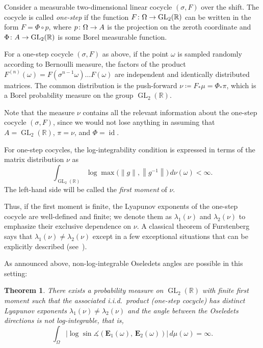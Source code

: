 \documentclass[10pt]{amsart}
\newtheorem{theo}{Theorem}[section]
\theoremstyle{definition}\newtheorem{defi}[theo]{Definition}\newtheorem{rema}[theo]{Remark}\newtheorem{exam}[theo]{Example}\newtheorem{exem}[theo]{Example}\newtheorem{nota}[theo]{Notation}
\newcommand{\R}{\mathbb{R}}
\newcommand{\E}{\mathbf{E}}
\DeclareMathOperator{\GL}{GL}
\DeclareMathOperator{\idd}{id}
\renewcommand{\angle}{\measuredangle}
\renewcommand*{\to}{\mathchoice{\longrightarrow}{\rightarrow}{\rightarrow}{\rightarrow}}
\begin{document}
Consider a measurable two-dimensional linear cocycle $(\sigma, F)$ over the shift. The cocycle is called \emph{one-step} if the function $F \colon \Omega \to \GL_2(\R)$ can be written in the form $F = \Phi \circ p$, where $p \colon \Omega \to A$ is the projection on the zeroth coordinate and $\Phi \colon A \to \GL_2(\R)$ is some Borel measurable function.

For a one-step cocycle $(\sigma, F)$ as above, if the point $\omega$ is sampled randomly according to Bernoulli measure, the factors of the product $F^{(n)}(\omega) = F(\sigma^{n-1} \omega) \dots F(\omega)$ are independent and identically distributed matrices. The common distribution is the push-forward $\nu \coloneqq F_* \mu = \Phi_* \pi$, which is a Borel probability measure on the group $\GL_2(\R)$.

Note that the measure $\nu$ contains all the relevant information about the one-step cocycle $(\sigma,F)$, since we would not lose anything in assuming that $A = \GL_2(\R)$, $\pi = \nu$, and $\Phi = \idd$.

For one-step cocycles, the log-integrability condition is expressed in terms of the matrix distribution $\nu$ as
\begin{equation}
\int_{\GL_2(\R)} \log \max \bigl(\|g\|, \left\|g^{-1}\right\| \bigr) \, d\nu(\omega) < \infty.
\end{equation}
The left-hand side will be called the \emph{first moment} of $\nu$.

Thus, if the first moment is finite, the Lyapunov exponents of the one-step cocycle are well-defined and finite; we denote them as $\lambda_1(\nu)$ and $\lambda_2(\nu)$ to emphasize their exclusive dependence on $\nu$. A classical theorem of Furstenberg says that $\lambda_1(\nu) \neq \lambda_2(\nu)$ except in a few exceptional situations that can be explicitly described (see~\cite{DF,ledrappier}).

As announced above, non-log-integrable Oseledets angles are possible in this setting:


\begin{theo}\label{t.nonintegrable}
There exists a probability measure on $\GL_2(\R)$ with finite first moment such that the associated i.i.d.~product (one-step cocycle) has distinct Lyapunov exponents $\lambda_1(\nu) \neq \lambda_2(\nu)$ and the angle between the Oseledets directions is not log-integrable, that is,
\begin{equation}
\int_{\Omega}\left|\log\sin \angle\left(\E_1(\omega),\,\E_2(\omega)\right) \right|\, d\mu(\omega) = \infty.
\end{equation}
\end{theo}
\end{document}
